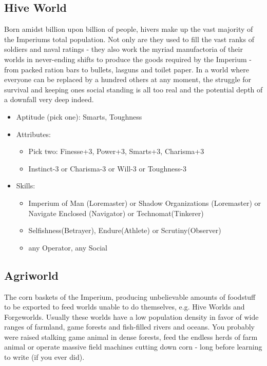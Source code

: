 	\subsection{Hive World}
	Born amidst billion upon billion of people, hivers make up the vast majority of the Imperiums total population. Not only are they used to fill the vast ranks of soldiers and naval ratings - they also work the myriad manufactoria of their worlds in never-ending shifts to produce the goods required by the Imperium - from packed ration bars to bullets, lasguns and toilet paper. In a world where everyone can be replaced by a hundred others at any moment, the struggle for survival and keeping ones social standing is all too real and the potential depth of a downfall very deep indeed.

	\begin{itemize}
		\item Aptitude (pick one): Smarts, Toughness
		\item Attributes:
		\begin{itemize}
			\item Pick two: Finesse+3, Power+3, Smarts+3, Charisma+3
			\item Instinct-3 or Charisma-3 or Will-3 or Toughness-3
		\end{itemize}
		\item Skills: 
		\begin{itemize}
		 	\item Imperium of Man (Loremaster) or Shadow Organizations (Loremaster) or Navigate Enclosed (Navigator) or Technomat(Tinkerer)
		 	\item Selfishness(Betrayer), Endure(Athlete) or Scrutiny(Observer)
		 	\item any Operator, any Social
		 \end{itemize} 
	\end{itemize}

	\subsection{Agriworld}
	The corn baskets of the Imperium, producing unbelievable amounts of foodstuff to be exported to feed worlds unable to do themselves, e.g. Hive Worlds and Forgeworlds. Usually these worlds have a low population density in favor of wide ranges of farmland, game forests and fish-filled rivers and oceans. You probably were raised stalking game animal in dense forests, feed the endless herds of farm animal or operate massive field machines cutting down corn - long before learning to write (if you ever did).

